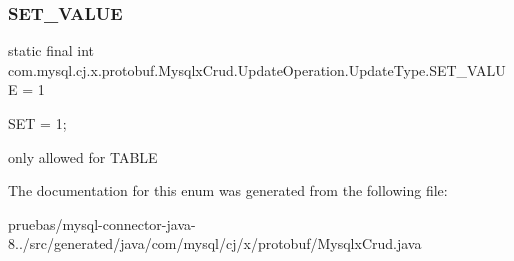 \subsubsection{\texorpdfstring{S\+E\+T\+\_\+\+V\+A\+L\+UE}{SET\_VALUE}}
{\footnotesize\ttfamily  static  final int com.\+mysql.\+cj.\+x.\+protobuf.\+Mysqlx\+Crud.\+Update\+Operation.\+Update\+Type.\+S\+E\+T\+\_\+\+V\+A\+L\+UE = 1\hspace{0.3cm}{\ttfamily [static]}}

{\ttfamily S\+ET = 1;}


\begin{DoxyPre}
only allowed for TABLE
\end{DoxyPre}
 

The documentation for this enum was generated from the following file\+:\begin{DoxyCompactItemize}
\item 
pruebas/mysql-\/connector-\/java-\/8../src/generated/java/com/mysql/cj/x/protobuf/Mysqlx\+Crud.\+java\end{DoxyCompactItemize}
